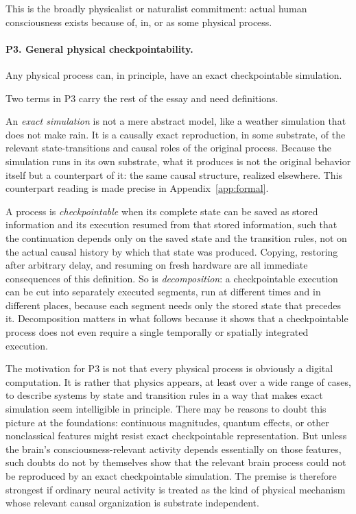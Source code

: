 \documentclass[11pt]{article}
\begin{document}
This is the broadly physicalist or naturalist commitment: actual human
consciousness exists because of, in, or as some physical process.

\paragraph{P3. General physical checkpointability.}
Any physical process can, in principle, have an exact checkpointable simulation.

Two terms in P3 carry the rest of the essay and need definitions.

An \emph{exact simulation} is not a mere abstract model, like a weather
simulation that does not make rain. It is a causally exact reproduction, in
some substrate, of the relevant state-transitions and causal roles of the
original process. Because the simulation runs in its own substrate, what it
produces is not the original behavior itself but a counterpart of it: the same
causal structure, realized elsewhere. This counterpart reading is made precise
in Appendix~\ref{app:formal}.

A process is \emph{checkpointable} when its complete state can be saved as
stored information and its execution resumed from that stored information,
such that the continuation depends only on the saved state and the transition
rules, not on the actual causal history by which that state was produced.
Copying, restoring after arbitrary delay, and resuming on fresh hardware are
all immediate consequences of this definition. So is \emph{decomposition}: a
checkpointable execution can be cut into separately executed segments, run at
different times and in different places, because each segment needs only the
stored state that precedes it. Decomposition matters in what follows because
it shows that a checkpointable process does not even require a single
temporally or spatially integrated execution.

The motivation for P3 is not that every physical process is obviously a digital
computation. It is rather that physics appears, at least over a wide range of
cases, to describe systems by state and transition rules in a way that makes
exact simulation seem intelligible in principle. There may be reasons to doubt
this picture at the foundations: continuous magnitudes, quantum effects, or
other nonclassical features might resist exact checkpointable representation.
But unless the brain's consciousness-relevant activity depends essentially on
those features, such doubts do not by themselves show that the relevant brain
process could not be reproduced by an exact checkpointable simulation. The
premise is therefore strongest if ordinary neural activity is treated as the
kind of physical mechanism whose relevant causal organization is substrate
independent.
\end{document}
